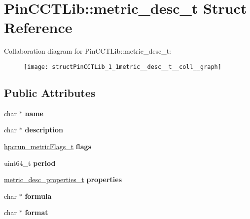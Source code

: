 \hypertarget{structPinCCTLib_1_1metric__desc__t}{\section{Pin\-C\-C\-T\-Lib\-:\-:metric\-\_\-desc\-\_\-t Struct Reference}
\label{structPinCCTLib_1_1metric__desc__t}
}


Collaboration diagram for Pin\-C\-C\-T\-Lib\-:\-:metric\-\_\-desc\-\_\-t\-:
\nopagebreak
\begin{figure}[H]
\begin{center}
\leavevmode
\texttt{[image: structPinCCTLib\_1\_1metric\_\_desc\_\_t\_\_coll\_\_graph]}
\end{center}
\end{figure}
\subsection*{Public Attributes}
\begin{DoxyCompactItemize}
\item 
\hypertarget{structPinCCTLib_1_1metric__desc__t_a6c5f38ea349c18b4b31e77c35041f8f7}{char $\ast$ {\bfseries name}}\label{structPinCCTLib_1_1metric__desc__t_a6c5f38ea349c18b4b31e77c35041f8f7}

\item 
\hypertarget{structPinCCTLib_1_1metric__desc__t_aca959d27e86e4c320802cefa6345d144}{char $\ast$ {\bfseries description}}\label{structPinCCTLib_1_1metric__desc__t_aca959d27e86e4c320802cefa6345d144}

\item 
\hypertarget{structPinCCTLib_1_1metric__desc__t_a6b26773de04d1ca0516020b551d6b78a}{\hyperlink{unionPinCCTLib_1_1hpcrun__metricFlags__t}{hpcrun\-\_\-metric\-Flags\-\_\-t} {\bfseries flags}}\label{structPinCCTLib_1_1metric__desc__t_a6b26773de04d1ca0516020b551d6b78a}

\item 
\hypertarget{structPinCCTLib_1_1metric__desc__t_a9eed6c590e9dc9390836983e8d58d820}{uint64\-\_\-t {\bfseries period}}\label{structPinCCTLib_1_1metric__desc__t_a9eed6c590e9dc9390836983e8d58d820}

\item 
\hypertarget{structPinCCTLib_1_1metric__desc__t_a0cd30e67d4803757cc97432a3371dae9}{\hyperlink{structPinCCTLib_1_1metric__desc__properties__t}{metric\-\_\-desc\-\_\-properties\-\_\-t} {\bfseries properties}}\label{structPinCCTLib_1_1metric__desc__t_a0cd30e67d4803757cc97432a3371dae9}

\item 
\hypertarget{structPinCCTLib_1_1metric__desc__t_a086a9d6817b5b225c7295b0d7c860879}{char $\ast$ {\bfseries formula}}\label{structPinCCTLib_1_1metric__desc__t_a086a9d6817b5b225c7295b0d7c860879}

\item 
\hypertarget{structPinCCTLib_1_1metric__desc__t_ab7590676bc8bc1ccbb2fe3417e23aea5}{char $\ast$ {\bfseries format}}\label{structPinCCTLib_1_1metric__desc__t_ab7590676bc8bc1ccbb2fe3417e23aea5}

\end{DoxyCompactItemize}


